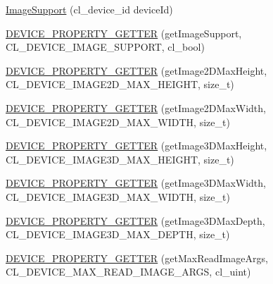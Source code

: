 \begin{DoxyCompactItemize}
\item 
\hyperlink{class_c_l_ray_tracer_1_1_open_c_l_utils_1_1_c_l_device_1_1_image_support_af41cef106f156a7e6363418a344ff3a8}{Image\+Support} (cl\+\_\+device\+\_\+id device\+Id)
\item 
\hyperlink{class_c_l_ray_tracer_1_1_open_c_l_utils_1_1_c_l_device_1_1_image_support_a008a16d48e7fd608cb4a4918d15b5fed}{D\+E\+V\+I\+C\+E\+\_\+\+P\+R\+O\+P\+E\+R\+T\+Y\+\_\+\+G\+E\+T\+T\+ER} (get\+Image\+Support, C\+L\+\_\+\+D\+E\+V\+I\+C\+E\+\_\+\+I\+M\+A\+G\+E\+\_\+\+S\+U\+P\+P\+O\+RT, cl\+\_\+bool)
\item 
\hyperlink{class_c_l_ray_tracer_1_1_open_c_l_utils_1_1_c_l_device_1_1_image_support_a134837e08223a01db3a5b1bced800491}{D\+E\+V\+I\+C\+E\+\_\+\+P\+R\+O\+P\+E\+R\+T\+Y\+\_\+\+G\+E\+T\+T\+ER} (get\+Image2\+D\+Max\+Height, C\+L\+\_\+\+D\+E\+V\+I\+C\+E\+\_\+\+I\+M\+A\+G\+E2\+D\+\_\+\+M\+A\+X\+\_\+\+H\+E\+I\+G\+HT, size\+\_\+t)
\item 
\hyperlink{class_c_l_ray_tracer_1_1_open_c_l_utils_1_1_c_l_device_1_1_image_support_a27577edb37e0a058e5be469424c78134}{D\+E\+V\+I\+C\+E\+\_\+\+P\+R\+O\+P\+E\+R\+T\+Y\+\_\+\+G\+E\+T\+T\+ER} (get\+Image2\+D\+Max\+Width, C\+L\+\_\+\+D\+E\+V\+I\+C\+E\+\_\+\+I\+M\+A\+G\+E2\+D\+\_\+\+M\+A\+X\+\_\+\+W\+I\+D\+TH, size\+\_\+t)
\item 
\hyperlink{class_c_l_ray_tracer_1_1_open_c_l_utils_1_1_c_l_device_1_1_image_support_af6dc80ecacfe425444d6e1ce2c27cdd3}{D\+E\+V\+I\+C\+E\+\_\+\+P\+R\+O\+P\+E\+R\+T\+Y\+\_\+\+G\+E\+T\+T\+ER} (get\+Image3\+D\+Max\+Height, C\+L\+\_\+\+D\+E\+V\+I\+C\+E\+\_\+\+I\+M\+A\+G\+E3\+D\+\_\+\+M\+A\+X\+\_\+\+H\+E\+I\+G\+HT, size\+\_\+t)
\item 
\hyperlink{class_c_l_ray_tracer_1_1_open_c_l_utils_1_1_c_l_device_1_1_image_support_a6db34fe9722a47e2f685b26245fb8a8b}{D\+E\+V\+I\+C\+E\+\_\+\+P\+R\+O\+P\+E\+R\+T\+Y\+\_\+\+G\+E\+T\+T\+ER} (get\+Image3\+D\+Max\+Width, C\+L\+\_\+\+D\+E\+V\+I\+C\+E\+\_\+\+I\+M\+A\+G\+E3\+D\+\_\+\+M\+A\+X\+\_\+\+W\+I\+D\+TH, size\+\_\+t)
\item 
\hyperlink{class_c_l_ray_tracer_1_1_open_c_l_utils_1_1_c_l_device_1_1_image_support_a68c540992f3c6ce2a8733b0551317b76}{D\+E\+V\+I\+C\+E\+\_\+\+P\+R\+O\+P\+E\+R\+T\+Y\+\_\+\+G\+E\+T\+T\+ER} (get\+Image3\+D\+Max\+Depth, C\+L\+\_\+\+D\+E\+V\+I\+C\+E\+\_\+\+I\+M\+A\+G\+E3\+D\+\_\+\+M\+A\+X\+\_\+\+D\+E\+P\+TH, size\+\_\+t)
\item 
\hyperlink{class_c_l_ray_tracer_1_1_open_c_l_utils_1_1_c_l_device_1_1_image_support_a70d74e6ad237e489d16c814148172d9a}{D\+E\+V\+I\+C\+E\+\_\+\+P\+R\+O\+P\+E\+R\+T\+Y\+\_\+\+G\+E\+T\+T\+ER} (get\+Max\+Read\+Image\+Args, C\+L\+\_\+\+D\+E\+V\+I\+C\+E\+\_\+\+M\+A\+X\+\_\+\+R\+E\+A\+D\+\_\+\+I\+M\+A\+G\+E\+\_\+\+A\+R\+GS, cl\+\_\+uint)

\end{DoxyCompactItemize}
